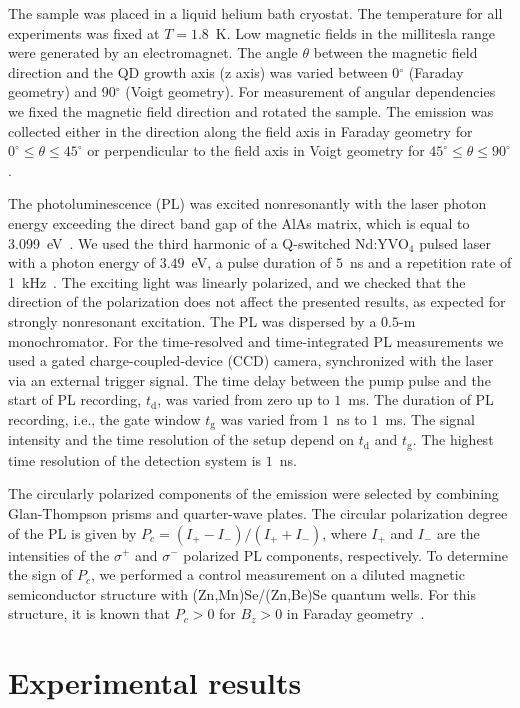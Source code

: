 \documentclass[twocolumn,showpacs,preprintnumbers,amsmath,amssymb,aps]{revtex4-1}
\begin{document}
The sample was placed in a liquid helium bath cryostat. The
temperature for all experiments was fixed at $T = 1.8$~K. Low
magnetic fields in the millitesla range were generated by an
electromagnet. The angle $\theta$ between the magnetic field
direction and the QD growth axis (z axis) was varied between
0$^{\circ}$ (Faraday geometry) and 90$^{\circ}$ (Voigt geometry).
For measurement of angular dependencies we fixed the magnetic field
direction and rotated the sample. The emission was collected either
in the direction along the field axis in Faraday geometry for
$0^{\circ} \leq \theta \leq 45^{\circ}$ or perpendicular to the
field axis in Voigt geometry for $45^{\circ} \leq \theta \leq
90^{\circ}$.

The photoluminescence (PL) was excited nonresonantly with the laser
photon energy exceeding the direct band gap of the AlAs matrix,
which is equal to 3.099~eV~\cite{Vurgaftman}. We used the third
harmonic of a Q-switched Nd:YVO$_4$ pulsed laser with a photon
energy of $3.49$~eV, a pulse duration of $5$~ns and a repetition rate of
1~kHz~\cite{Shamirzaev84}. The exciting light was linearly polarized,
and we checked that the direction of the polarization does not
affect the presented results, as expected for strongly
nonresonant excitation. The PL was dispersed by a $0.5$-m
monochromator. For the time-resolved and time-integrated PL
measurements we used a gated charge-coupled-device (CCD) camera,
synchronized with the laser via an external trigger signal. The time
delay between the pump pulse and the start of PL recording,
$t_{\text{d}}$, was varied from zero up to $1$~ms. The duration
of PL recording, i.e., the gate window $t_{\text{g}}$ was
varied from $1$~ns to $1$~ms. The signal intensity and the time
resolution of the setup depend on $t_{\text{d}}$ and $t_{\text{g}}$.
The highest time resolution of the detection system is $1$~ns.

The circularly polarized components of the emission were selected by
combining Glan-Thompson prisms and quarter-wave plates. The circular
polarization degree of the PL is given by $P_c
=(I_{+}-I_{-})/(I_{+}+ I_{-})$, where $ I_{+}$ and $I_{-}$ are the
intensities of the $\sigma^{+}$ and $\sigma^{-}$ polarized PL
components, respectively. To determine the sign of $P_c$, we
performed a control measurement on a diluted magnetic
semiconductor structure with (Zn,Mn)Se/(Zn,Be)Se quantum wells. For
this structure, it is known that $P_c>0$ for $B_z>0$ in Faraday
geometry~\cite{Keller}.


\section{Experimental results}
\label{sec:2}
\end{document}
